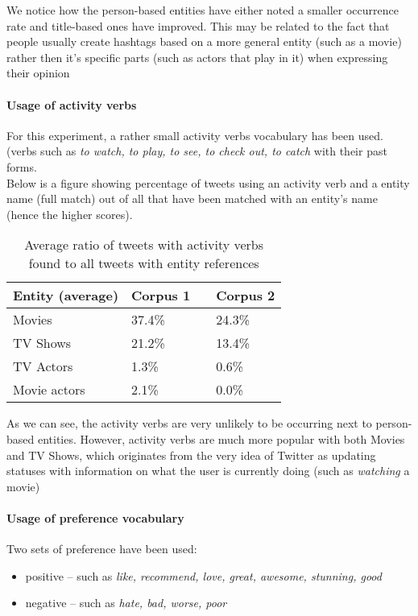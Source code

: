 We notice how the person-based entities have either noted a smaller
occurrence rate and title-based ones have improved. This may be related to the
fact that people usually create hashtags based on a more general entity (such as
a movie) rather then it's specific parts (such as actors that play in it)
when expressing their opinion \cite{edinburg-corpus}

\paragraph{Usage of activity verbs}
For this experiment, a rather small activity verbs vocabulary has been used. (verbs such
as \textit{to watch, to play, to see, to check out, to catch} with their past forms.
\\ Below is a figure showing percentage of tweets using an activity verb
and a entity name (full match) out of all that have been matched with an
entity's name (hence the higher scores).

\begin{center}
  \begin{table}[h!b!p!]
    \begin{tabular}{ | p{4cm} | p{2cm} | p{1cm}| p{2cm} | } \hline
      Entity (average) & Corpus 1 & & Corpus 2 \\ \hline
      Movies & 37.4\% & & 24.3\% \\ \hline
      TV Shows & 21.2\% & & 13.4\% \\ \hline
      TV Actors & 1.3\% & & 0.6\% \\ \hline
      Movie actors & 2.1\% & & 0.0\% \\ \hline
    \end{tabular}
    \caption{Average ratio of tweets with activity verbs found to all tweets with entity references}
  \end{table}
\end{center}

As we can see, the activity verbs are very unlikely to be occurring next to
person-based entities. However, activity verbs are much more popular with both
Movies and TV Shows, which originates from the very idea of Twitter as
updating statuses with information on what the user is currently doing (such as \textit{watching}
a movie)

\paragraph{Usage of preference vocabulary}
Two sets of preference have been used:
\begin{itemize}
  \item positive -- such as \textit{like, recommend, love, great, awesome, stunning, good}
  \item negative -- such as \textit{hate, bad, worse, poor}
\end{itemize}

